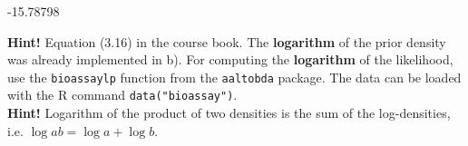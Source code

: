 \documentclass[11pt,a4paper,english]{article}
\begin{document}
\begin{enumerate}
\begin{itemize}
  
\begin{Schunk}
\begin{Soutput}
[1] -15.78798
\end{Soutput}
\end{Schunk}
\textbf{Hint!} Equation (3.16) in the course book. The \textbf{logarithm} of the prior density was already implemented in b). For computing the \textbf{logarithm} of the likelihood, use the {\tt bioassaylp} function from the {\tt aaltobda} package. The data can be loaded with the R command {\tt data("bioassay")}.\\
\textbf{Hint!} Logarithm of the product of two densities is the sum of the log-densities, i.e. $\log ab = \log a + \log b$.


\end{itemize}
\end{enumerate}
\end{document}
